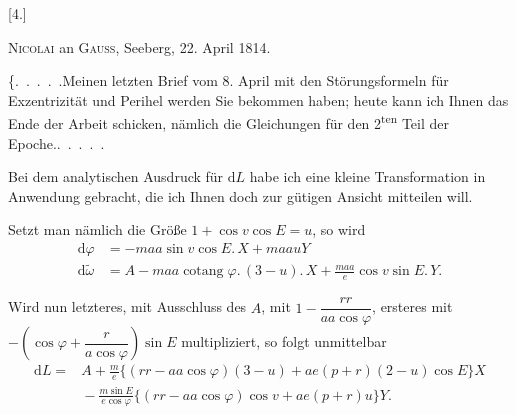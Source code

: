 \clearpage
\begingroup
{}
\renewcommand{\headrulewidth}{0pt}
\par\medskip
{}
\begin{center}
[4.]\par\medskip
\textsc{Nicolai} an \textsc{Gauss}, Seeberg, 22. April 1814.
\end{center}
\par\noindent\hspace*{\parindent}\{.\ .\ .\ .\ .\quad Meinen letzten Brief vom 8. April mit den Störungsformeln für
Exzentrizität und Perihel werden Sie bekommen haben; heute kann ich
Ihnen das Ende der Arbeit schicken, nämlich die Gleichungen für den 2\textsuperscript{ten}
Teil der Epoche.\quad .\ .\ .\ .\ .

\par\noindent\hspace*{\parindent}Bei dem analytischen Ausdruck für \(\mathrm{d}L\) habe ich eine kleine Transformation
in Anwendung gebracht, die ich Ihnen doch zur gütigen Ansicht mitteilen will.

\par\noindent\hspace*{\parindent}Setzt man nämlich die Größe \(1+\cos v\cos E=u\), so wird
\[
\begin{aligned}
\mathrm{d}\varphi&=-maa\sin v\cos E\mathord{.}\,X+maauY\\
\mathrm{d}\tilde\omega&=A-maa\operatorname{cotang}\varphi\mathord{.}\,(3-u)\mathord{.}\,X
  +\frac{maa}{e}\cos v\sin E\mathord{.}\,Y.
\end{aligned}
\]

\par\noindent\hspace*{\parindent}Wird nun letzteres, mit Ausschluss des \(A\), mit \(1-\dfrac{rr}{aa\cos\varphi}\), ersteres mit
\(-\left(\cos\varphi+\dfrac{r}{a\cos\varphi}\right)\sin E\) multipliziert, so folgt unmittelbar
\[
\begin{aligned}
\mathrm{d}L={}&A+\frac{m}{e}\bigl\{(rr-aa\cos\varphi)(3-u)+ae(p+r)(2-u)\cos E\bigr\}X\\
 &{}-\frac{m\sin E}{e\cos\varphi}\bigl\{(rr-aa\cos\varphi)\cos v+ae(p+r)u\bigr\}Y.
\end{aligned}
\]

